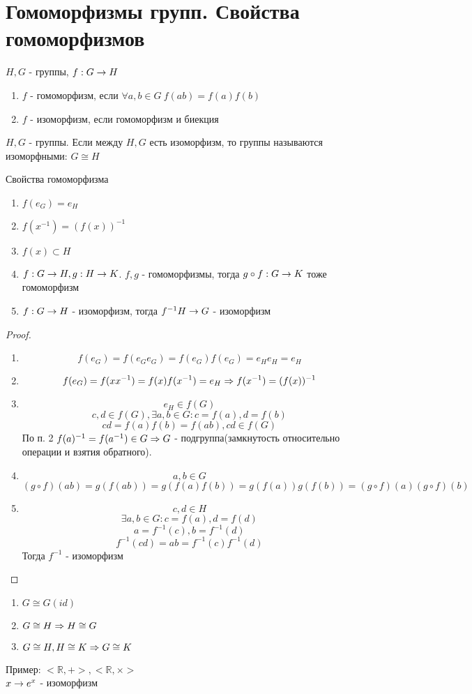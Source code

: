 \section{Гомоморфизмы групп. Свойства гомоморфизмов}
\begin{Def}
	$H, G$ - группы, $f: G \rightarrow H$
	\begin{enumerate}
		\item $f$ - гомоморфизм, если $\forall a, b \in G \: f(ab) = f(a)f(b)$
		\item $f$ - изоморфизм, если гомоморфизм и биекция
	\end{enumerate}
\end{Def}

\begin{Def}
	$H, G$ - группы. Если между $H, G$ есть изоморфизм, то группы называются изоморфными: $G \cong H$      \\
\end{Def}						

\begin{theorem}{Свойства гомоморфизма}
	\begin{enumerate}
		\item $f(e_G) = e_H$
		\item $f(x^{-1}) = (f(x))^{-1}$
		\item $f(x) \subset H$
		\item $f: G \rightarrow H, g: H \rightarrow K$. $f, g$ - гомоморфизмы, тогда $g \circ f: G \rightarrow K$ тоже гомоморфизм
		\item $f: G \rightarrow H$ - изоморфизм, тогда $f^{-1} H \rightarrow G$ - изоморфизм
	\end{enumerate}
\end{theorem}
\begin{proof}
	\begin{enumerate}
		\item $$f(e_G) = f(e_G e_G) = f(e_G)f(e_G) = e_H e_H = e_H$$
		\item $$f(e_G) = f(x x^{-1}) = f(x)f(x^{-1}) = e_H \Rightarrow f(x^{-1}) = (f(x))^{-1}$$
		\item 
			$$e_H \in f(G)$$
			$$c, d \in f(G), \exists a, b \in G: c = f(a), d = f(b)$$
			$$cd = f(a)f(b) = f(ab), cd \in f(G)$$ 
			По п. 2 $f(a)^{-1} = f(a^{-1}) \in G \Rightarrow G$ - подгруппа(замкнутость относительно операции и взятия обратного).
		\item
			$$a, b \in G$$
			$$(g \circ f)(ab) = g(f(ab)) = g(f(a)f(b)) = g(f(a))g(f(b)) = (g \circ f)(a)(g \circ f)(b)$$
		\item
			$$c, d \in H$$
			$$\exists a, b \in G: c = f(a), d = f(d)$$
			$$a = f^{-1}(c), b = f^{-1}(d)$$
			$$f^{-1}(cd) = ab = f^{-1}(c)f^{-1}(d)$$
			Тогда $f^{-1}$ - изоморфизм			
	\end{enumerate}   
\end{proof}		

\begin{conseq}
    \begin{enumerate}
    \item  $G \cong G (id)$
    \item  $G \cong H \Rightarrow H \cong G$
    \item  $G \cong H, H \cong K \Rightarrow G \cong K$
    \end{enumerate}

\end{conseq}

Пример: $< \mathbb{R}, +>, < \mathbb{R}, \times>$ \\
$x \rightarrow e^x$ - изоморфизм

